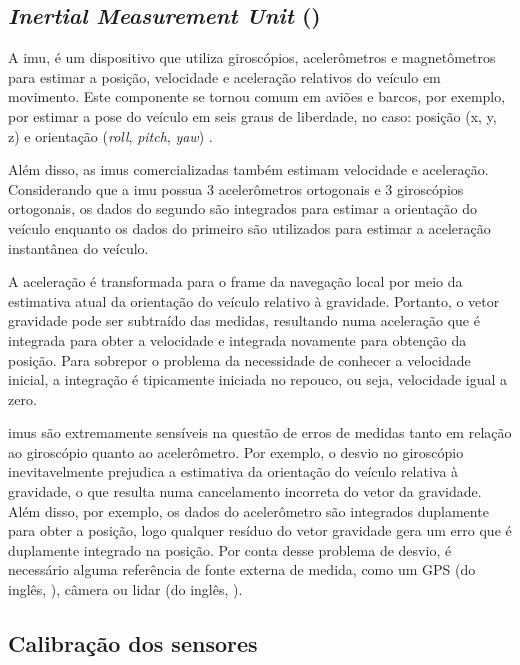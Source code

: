 \documentclass[acronym, symbols, table, deposito]{fei}
\begin{document}
			\subsection{\textit{Inertial Measurement Unit} ()}
			
				A \acrshort{imu}, é um dispositivo que utiliza giroscópios, acelerômetros e magnetômetros para estimar a posição, velocidade e aceleração relativos do veículo em movimento. Este componente se tornou comum em aviões e barcos, por exemplo, por estimar a pose do veículo em seis graus de liberdade, no caso: posição (x, y, z) e orientação (\textit{roll}, \textit{pitch}, \textit{yaw}) \cite{siegwart2011introduction}.
				
				Além disso, as \acrshort{imu}s comercializadas também estimam velocidade e aceleração. Considerando que a \acrshort{imu} possua 3 acelerômetros ortogonais e 3 giroscópios ortogonais, os dados do segundo são integrados para estimar a orientação do veículo enquanto os dados do primeiro são utilizados para estimar a aceleração instantânea do veículo.
				
				A aceleração é transformada para o frame da navegação local por meio da estimativa atual da orientação do veículo relativo à gravidade. Portanto, o vetor gravidade pode ser subtraído das medidas, resultando numa aceleração que é integrada para obter a velocidade e integrada novamente para obtenção da posição. Para sobrepor o problema da necessidade de conhecer a velocidade inicial, a integração é tipicamente iniciada no repouco, ou seja, velocidade igual a zero.
				
				\acrshort{imu}s são extremamente sensíveis na questão de erros de medidas tanto em relação ao giroscópio quanto ao acelerômetro. Por exemplo, o desvio no giroscópio inevitavelmente prejudica a estimativa da orientação do veículo relativa à gravidade, o que resulta numa cancelamento incorreta do vetor da gravidade. Além disso, por exemplo, os dados do acelerômetro são integrados duplamente para obter a posição, logo qualquer resíduo do vetor gravidade gera um erro que é duplamente integrado na posição. Por conta desse problema de desvio, é necessário alguma referência de fonte externa de medida, como um GPS (do inglês, ), câmera ou \acrshort{lidar} (do inglês, ).
		
		\subsection{Calibração dos sensores}\label{sec:calibracao_sensores}
		
\end{document}
